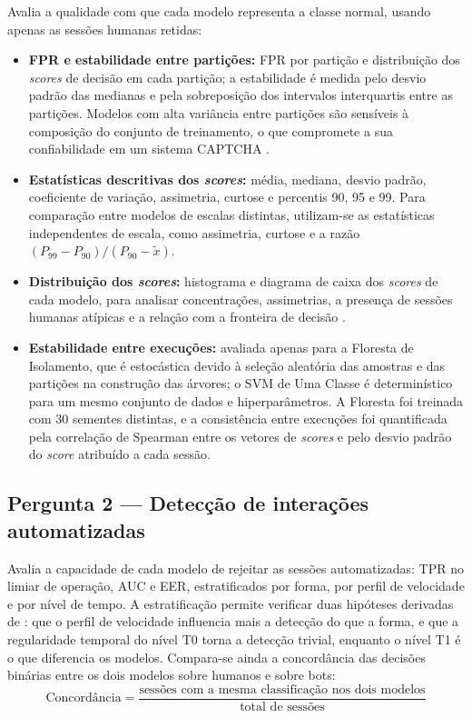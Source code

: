 Avalia a qualidade com que cada modelo representa a classe normal, usando apenas as sessões humanas retidas:
\begin{itemize}
    \item \textbf{FPR e estabilidade entre partições:} FPR por partição e distribuição dos \textit{scores} de decisão em cada partição; a estabilidade é medida pelo desvio padrão das medianas e pela sobreposição dos intervalos interquartis entre as partições. Modelos com alta variância entre partições são sensíveis à composição do conjunto de treinamento, o que compromete a sua confiabilidade em um sistema CAPTCHA \cite{marques2023}.
    \item \textbf{Estatísticas descritivas dos \textit{scores}:} média, mediana, desvio padrão, coeficiente de variação, assimetria, curtose e percentis 90, 95 e 99. Para comparação entre modelos de escalas distintas, utilizam-se as estatísticas independentes de escala, como assimetria, curtose e a razão $(P_{99} - P_{90}) / (P_{90} - \tilde{x})$.
    \item \textbf{Distribuição dos \textit{scores}:} histograma e diagrama de caixa dos \textit{scores} de cada modelo, para analisar concentrações, assimetrias, a presença de sessões humanas atípicas e a relação com a fronteira de decisão \cite{scholkopf2001b, liu2008}.
    \item \textbf{Estabilidade entre execuções:} avaliada apenas para a Floresta de Isolamento, que é estocástica devido à seleção aleatória das amostras e das partições na construção das árvores; o SVM de Uma Classe é determinístico para um mesmo conjunto de dados e hiperparâmetros. A Floresta foi treinada com 30 sementes distintas, e a consistência entre execuções foi quantificada pela correlação de Spearman entre os vetores de \textit{scores} e pelo desvio padrão do \textit{score} atribuído a cada sessão.
\end{itemize}

\subsection{Pergunta 2 --- Detecção de interações automatizadas}

Avalia a capacidade de cada modelo de rejeitar as sessões automatizadas: TPR no limiar de operação, AUC e EER, estratificados por forma, por perfil de velocidade e por nível de tempo. A estratificação permite verificar duas hipóteses derivadas de : que o perfil de velocidade influencia mais a detecção do que a forma, e que a regularidade temporal do nível T0 torna a detecção trivial, enquanto o nível T1 é o que diferencia os modelos. Compara-se ainda a concordância das decisões binárias entre os dois modelos sobre humanos e sobre bots:
\begin{equation}
    \text{Concordância} = \frac{\text{sessões com a mesma classificação nos dois modelos}}{\text{total de sessões}}
    \label{eq:concordancia}
\end{equation}

